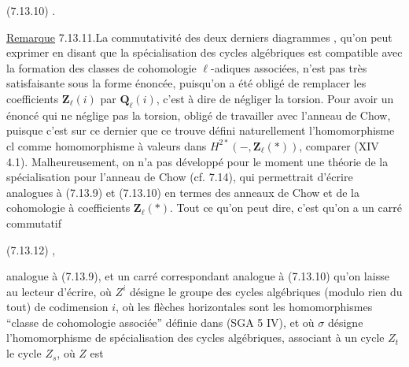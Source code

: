 
(7.13.10)\quad
{}.

 \uline{Remarque} 7.13.11.\quad La commutativité des deux derniers diagrammes , qu'on peut exprimer en disant que la spécialisation des cycles algébriques est compatible avec la formation des classes de cohomologie $\ell$-adiques associées, n'est pas très satisfaisante sous la forme énoncée, puisqu'on  a été obligé de remplacer les coefficients $\mathbf Z_\ell(i)$ par $\mathbf Q_\ell(i)$, c'est à dire de négliger la torsion. Pour avoir un énoncé qui ne néglige pas la torsion,  obligé de travailler avec l'anneau de Chow, puisque c'est sur ce dernier que ce trouve défini naturellement l'homomorphisme $\mathrm{cl}$ comme homomorphisme à valeurs dans $H^{2*}(-,\mathbf Z_\ell(*))$,  comparer (XIV 4.1). Malheureusement, on n'a pas développé pour le moment une théorie de la spécialisation pour l'anneau de Chow\deleted{\unsure{,}} (cf. 7.14), qui permettrait d'écrire   analogues à (7.13.9) et (7.13.10) en termes des anneaux de Chow et de la cohomologie à coefficients $\mathbf Z_\ell(*)$. Tout ce qu'on peut dire, c'est qu'on a un carré commutatif

(7.13.12)\quad
{},

 analogue à (7.13.9), et un carré correspondant analogue à (7.13.10) qu'on laisse au lecteur d'écrire, où $Z^i$ désigne le groupe des cycles algébriques (modulo rien du tout) de codimension $i$,  où les flèches horizontales sont les homomorphismes ``classe de cohomologie associée'' définie dans (SGA 5 IV), et où $\sigma$ désigne l'homomorphisme de spécialisation des cycles algébriques, associant à un cycle $Z_t$ le cycle $Z_s$, où $Z$ est
